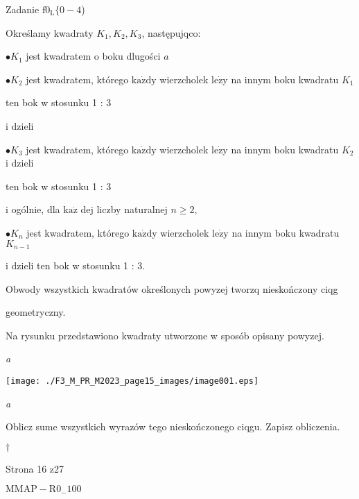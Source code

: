 \documentclass[a4paper,12pt]{article}
\begin{document}
Zadanie $\mathrm{f}0_{\mathrm{L}}\{0-4$)

Określamy kwadraty $K_{1}, K_{2}, K_{3}$, następujqco:

$\bullet K_{1}$ jest kwadratem o boku dlugości $a$

$\bullet K_{2}$ jest kwadratem, którego $\mathrm{k}\mathrm{a}\dot{\mathrm{z}}\mathrm{d}\mathrm{y}$ wierzcholek $\mathrm{l}\mathrm{e}\dot{\mathrm{z}}\mathrm{y}$ na innym boku kwadratu $K_{1}$

ten bok w stosunku 1 : 3

i dzieli

$\bullet K_{3}$ jest kwadratem, którego $\mathrm{k}\mathrm{a}\dot{\mathrm{z}}\mathrm{d}\mathrm{y}$ wierzcholek $\mathrm{l}\mathrm{e}\dot{\mathrm{z}}\mathrm{y}$ na innym boku kwadratu $K_{2}$ i dzieli

ten bok w stosunku 1 : 3

i ogólnie, dla $\mathrm{k}\mathrm{a}\dot{\mathrm{z}}$ dej liczby naturalnej $n\geq 2,$

$\bullet K_{n}$ jest kwadratem, którego $\mathrm{k}\mathrm{a}\dot{\mathrm{z}}\mathrm{d}\mathrm{y}$ wierzcholek $\mathrm{l}\mathrm{e}\dot{\mathrm{z}}\mathrm{y}$ na innym boku kwadratu $K_{n-1}$

i dzieli ten bok w stosunku 1 : 3.

Obwody wszystkich kwadratów określonych powyzej tworzq nieskończony ciqg

geometryczny.

Na rysunku przedstawiono kwadraty utworzone w sposób opisany powyzej.

{\it a}
\begin{center}
\texttt{[image: ./F3\_M\_PR\_M2023\_page15\_images/image001.eps]}
\end{center}
{\it a}

Oblicz sume wszystkich wyrazów tego nieskończonego ciqgu. Zapisz obliczenia.

$\dagger$

Strona 16 z27

$\mathrm{M}\mathrm{M}\mathrm{A}\mathrm{P}-\mathrm{R}0_{-}100$
\end{document}
